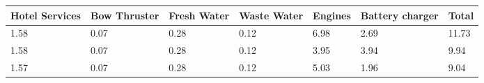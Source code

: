 \begin{tabular}{lllllll}
Hotel Services & Bow Thruster & Fresh Water & Waste Water & Engines & Battery charger & Total \\ 
\hline 
1.58 & 0.07 & 0.28 & 0.12 & 6.98 & 2.69 & 11.73 \\ 
1.58 & 0.07 & 0.28 & 0.12 & 3.95 & 3.94 & 9.94 \\ 
1.57 & 0.07 & 0.28 & 0.12 & 5.03 & 1.96 & 9.04 \\ 
\hline 
\end{tabular}